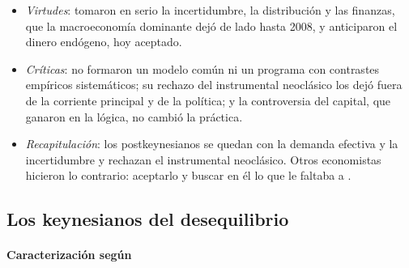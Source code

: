 \documentclass[11pt]{article}
\begin{document}
\begin{itemize}
\item \emph{Virtudes}: tomaron en serio la incertidumbre, la distribución y las finanzas, que la macroeconomía dominante dejó de lado hasta 2008, y anticiparon el dinero endógeno, hoy aceptado.
\item \emph{Críticas}: no formaron un modelo común ni un programa con contrastes empíricos sistemáticos; su rechazo del instrumental neoclásico los dejó fuera de la corriente principal y de la política; y la controversia del capital, que ganaron en la lógica, no cambió la práctica.
\item \emph{Recapitulación}: los postkeynesianos se quedan con la demanda efectiva y la incertidumbre y rechazan el instrumental neoclásico. Otros economistas hicieron lo contrario: aceptarlo y buscar en él lo que le faltaba a .
\end{itemize}

\subsection{Los keynesianos del desequilibrio}\label{sec:desequilibrio}

\paragraph{Caracterización según }
\end{document}
